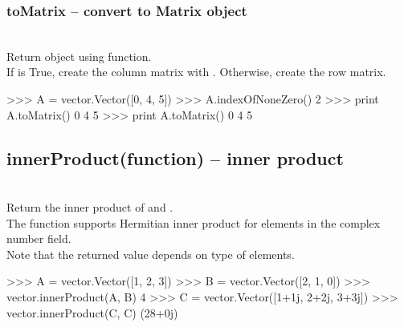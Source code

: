   \subsubsection{toMatrix -- convert to Matrix object}
   \\
   \spacing
   \quad Return  object using  function.\\
   \spacing
   \quad If  is True, create the column matrix with .
   Otherwise, create the row matrix.\\
\begin{ex}
>>> A = vector.Vector([0, 4, 5])
>>> A.indexOfNoneZero()
2
>>> print A.toMatrix()
0 4 5
>>> print A.toMatrix()
0
4
5
\end{ex}%
\C
  \subsection{innerProduct(function) -- inner product}
  \\
   \spacing
   \quad Return the inner product of  and .\\
   \spacing
   \quad The function supports Hermitian inner product for elements in the complex number field.\\
   \spacing
   \quad \negok Note that the returned value depends on type of elements.\\
\begin{ex}
>>> A = vector.Vector([1, 2, 3])
>>> B = vector.Vector([2, 1, 0])
>>> vector.innerProduct(A, B)
4
>>> C = vector.Vector([1+1j, 2+2j, 3+3j])
>>> vector.innerProduct(C, C)
(28+0j)
\end{ex}%
\C



